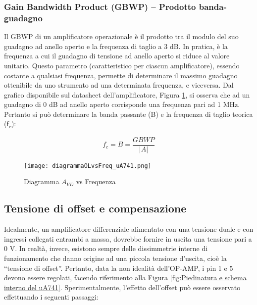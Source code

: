 \subsubsection{Gain Bandwidth Product (GBWP) – Prodotto banda-guadagno}
Il GBWP di un amplificatore operazionale è il prodotto tra il modulo del suo guadagno ad anello aperto e la frequenza di taglio a 3 dB. In pratica, è la frequenza a cui il guadagno di tensione ad anello aperto si riduce al valore unitario. Questo parametro (caratteristico per ciascun amplificatore), essendo costante a qualsiasi
frequenza, permette di determinare il massimo guadagno ottenibile da uno strumento ad una determinata frequenza, e viceversa. Dal grafico disponibile sul datasheet dell’amplificatore, Figura \ref{fig:Diagramma Avd vs Frequenza},  si osserva che ad un guadagno di 0 dB ad anello aperto corrisponde una frequenza pari ad 1 MHz.
Pertanto si può determinare la banda passante (B) e la frequenza di taglio teorica (f\textsubscript{c}):

\[f_c=B=\frac{GBWP}{|A|}\]
\begin{figure}
    \centering
    \texttt{[image: diagrammaOLvsFreq\_uA741.png]}
    \caption{Diagramma $A_{VD}$ vs Frequenza}
    \label{fig:Diagramma Avd vs Frequenza}
\end{figure}
\FloatBarrier

\subsection{Tensione di offset e compensazione}
Idealmente, un amplificatore differenziale alimentato con una tensione duale e con ingressi collegati entrambi a massa, dovrebbe fornire in uscita una tensione pari a 0 V. In realtà, invece, esistono sempre delle dissimmetrie interne di funzionamento che danno origine ad una piccola tensione d’uscita, cioè la “tensione di offset”. Pertanto, data la non idealità dell'OP-AMP, i pin 1 e 5 devono essere regolati, facendo riferimento alla Figura \ref{fig:Piedinatura e schema interno del uA741}. Sperimentalmente, l’effetto dell’offset può essere osservato effettuando i seguenti passaggi:

